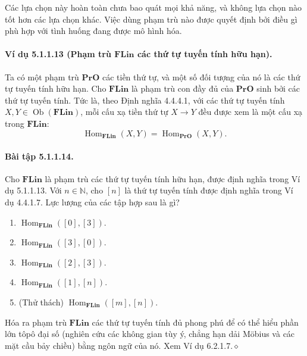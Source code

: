 Các lựa chọn này hoàn toàn chưa bao quát mọi khả năng, và không lựa chọn nào tốt hơn các lựa chọn khác. Việc dùng phạm trù nào được quyết định bởi điều gì phù hợp với tình huống đang được mô hình hóa.
\paragraph{Ví dụ 5.1.1.13 (Phạm trù $\mathbf{FLin}$ các thứ tự tuyến tính hữu hạn).} Ta có một phạm trù $\mathbf{PrO}$ các tiền thứ tự, và một số đối tượng của nó là các thứ tự tuyến tính hữu hạn. Cho $\mathbf{FLin}$ là phạm trù con đầy đủ của $\mathbf{PrO}$ sinh bởi các thứ tự tuyến tính. Tức là, theo Định nghĩa 4.4.4.1, với các thứ tự tuyến tính $X,Y\in\operatorname{Ob}(\mathbf{FLin})$, mỗi cấu xạ tiền thứ tự $X\to Y$ đều được xem là một cấu xạ trong $\mathbf{FLin}$:
\[\operatorname{Hom}_{\mathbf{FLin}}(X,Y)=\operatorname{Hom}_{\mathbf{PrO}}(X,Y).\]
\paragraph{Bài tập 5.1.1.14.} Cho $\mathbf{FLin}$ là phạm trù các thứ tự tuyến tính hữu hạn, được định nghĩa trong Ví dụ 5.1.1.13. Với $n\in\mathbb N$, cho $[n]$ là thứ tự tuyến tính được định nghĩa trong Ví dụ 4.4.1.7. Lực lượng của các tập hợp sau là gì?
\begin{enumerate}[label=\alph*.]
\item $\operatorname{Hom}_{\mathbf{FLin}}([0],[3])$.
\item $\operatorname{Hom}_{\mathbf{FLin}}([3],[0])$.
\item $\operatorname{Hom}_{\mathbf{FLin}}([2],[3])$.
\item $\operatorname{Hom}_{\mathbf{FLin}}([1],[n])$.
\item (Thử thách) $\operatorname{Hom}_{\mathbf{FLin}}([m],[n])$.
\end{enumerate}
Hóa ra phạm trù $\mathbf{FLin}$ các thứ tự tuyến tính đủ phong phú để có thể hiểu phần lớn tôpô đại số (nghiên cứu các không gian tùy ý, chẳng hạn dải Möbius và các mặt cầu bảy chiều) bằng ngôn ngữ của nó. Xem Ví dụ 6.2.1.7.\hfill$\diamond$
